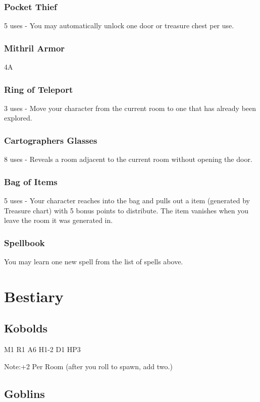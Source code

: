 \documentclass[a6paper,hidelinks]{article}
\begin{document}
\subsubsection{Pocket Thief}
5 uses - You may automatically unlock one door or treasure chest per use.

\subsubsection{Mithril Armor}
4A

\subsubsection{Ring of Teleport}
3 uses -  Move your character from the current room to one that has already been explored.

\subsubsection{Cartographers Glasses}
8 uses - Reveals a room adjacent to the current room without opening the door.

\subsubsection{Bag of Items}
5 uses - Your character reaches into the bag and pulls out a item (generated by Treasure chart) with 5 bonus points to distribute. The item vanishes when you leave the room it was generated in.

\subsubsection{Spellbook}
You may learn one new spell from the list of spells above.

\section{Bestiary}

\subsection{Kobolds}
M1 R1 A6 H1-2 D1 HP3

Note:+2 Per Room (after you roll to spawn, add two.)

\subsection{Goblins}
\end{document}
